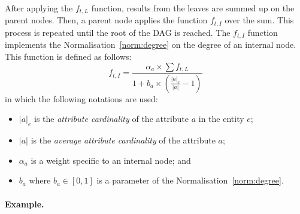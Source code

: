 After applying the $f_{t,L}$ function, results from the leaves are summed up on the parent nodes. Then, a parent node applies the function $f_{t,I}$ over the sum. This process is repeated until the root of the DAG is reached. The $f_{t,I}$ function implements the Normalisation~\ref{norm:degree} on the degree of an internal node. This function is defined as follows:
\begin{equation}
\label{bm25mf_a}
f_{t,I} = \frac{\alpha_a \times \sum{f_{t,L}} }{ 1 + b_a \times \left(\frac{ \left|{a}\right|_e }{ \left|{a}\right| } - 1\right) }
\end{equation}
in which the following notations are used:
\begin{itemize}
\item $\left|{a}\right|_e$ is the \emph{attribute cardinality} of the attribute $a$ in the entity $e$;
\item $\left|{a}\right|$ is the \emph{average attribute cardinality} of the attribute $a$;
\item $\alpha_a$ is a weight specific to an internal node; and
\item $b_a$ where $b_a \in \left[0,1\right]$ is a parameter of the Normalisation~\ref{norm:degree}.
\end{itemize}

\paragraph{Example.}

